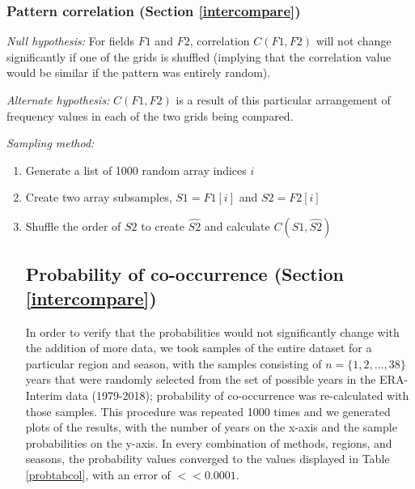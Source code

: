\documentclass[smallextended]{svjour3}       %
\numberwithin{equation}{section}
\begin{document}
\begin{appendices}
\subsubsection{Pattern correlation (Section \ref{intercompare})}
\textit{Null hypothesis:} For fields $F1$ and $F2$, correlation $C(F1,F2)$ will not change significantly if one of the grids is shuffled (implying that the correlation value would be similar if the pattern was entirely random).

\noindent\textit{Alternate hypothesis:} $C(F1,F2)$ is a result of this particular arrangement of frequency values in each of the two grids being compared.

\noindent\textit{Sampling method:}\begin{enumerate}
    \item Generate a list of 1000 random array indices $i$
        \item Create two array subsamples, $S1=F1[i]$ and $S2=F2[i]$
        \item Shuffle the order of $S2$ to create $\widehat{S2}$ and calculate $C(S1,\widehat{S2})$
        
\subsection{Probability of co-occurrence (Section \ref{intercompare})}

In order to verify that the probabilities would not significantly change with the addition of more data, we took samples of the entire dataset for a particular region and season, with the samples consisting of $n=\{1,2,...,38\}$ years that were randomly selected from the set of possible years in the ERA-Interim data (1979-2018); probability of co-occurrence was re-calculated with those samples. This procedure was repeated 1000 times and we generated plots of the results, with the number of years on the x-axis and the sample probabilities on the y-axis. In every combination of methods, regions, and seasons, the probability values converged to the values displayed in Table \ref{probtabcol}, with an error of $<<0.0001$. 
\end{enumerate}




\end{appendices}




\pagebreak
\end{document}
